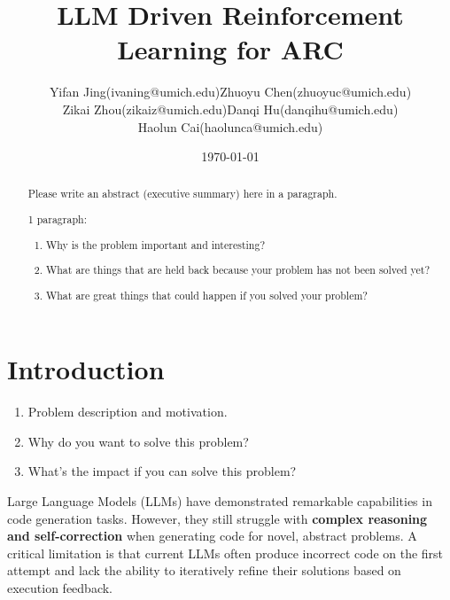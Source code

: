\documentclass[11pt,letterpaper]{article}
\begin{document}
\title{LLM Driven Reinforcement Learning for ARC}

\author{
\begin{tabular}{lll}
Yifan Jing(ivaning@umich.edu) & Zhuoyu Chen(zhuoyuc@umich.edu) \\
Zikai Zhou(zikaiz@umich.edu) & Danqi Hu(danqihu@umich.edu) \\
Haolun Cai(haolunca@umich.edu) &
\end{tabular}
}
\date{\today}
\maketitle



\begin{abstract}
Please write an abstract (executive summary) here in a paragraph.

{\color{red}
1 paragraph:
\begin{enumerate}
    \item Why is the problem important and interesting?
    \item What are things that are held back because your problem has not been solved yet?
    \item What are great things that could happen if you solved your problem?
\end{enumerate}
}
\end{abstract}




\section{Introduction}
{\color{red}
\begin{enumerate}
    \item Problem description and motivation.
    \item Why do you want to solve this problem?
    \item What's the impact if you can solve this problem?
\end{enumerate}
}




Large Language Models (LLMs) have demonstrated remarkable capabilities in code generation tasks. However, they still struggle with \textbf{complex reasoning and self-correction} when generating code for novel, abstract problems. A critical limitation is that current LLMs often produce incorrect code on the first attempt and lack the ability to iteratively refine their solutions based on execution feedback.
\end{document}
